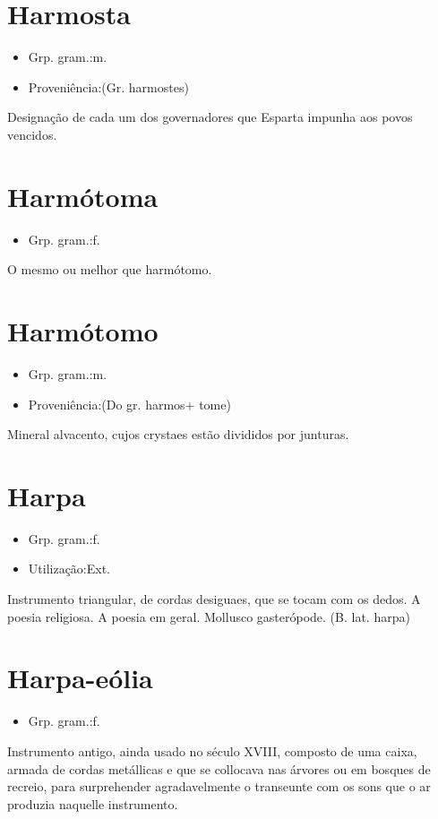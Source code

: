\documentclass{article}
\begin{document}
\section{Harmosta}
\begin{itemize}
\item {Grp. gram.:m.}
\end{itemize}
\begin{itemize}
\item {Proveniência:(Gr. \textunderscore harmostes\textunderscore )}
\end{itemize}
Designação de cada um dos governadores que Esparta impunha aos povos vencidos.
\section{Harmótoma}
\begin{itemize}
\item {Grp. gram.:f.}
\end{itemize}
O mesmo ou melhor que \textunderscore harmótomo\textunderscore .
\section{Harmótomo}
\begin{itemize}
\item {Grp. gram.:m.}
\end{itemize}
\begin{itemize}
\item {Proveniência:(Do gr. \textunderscore harmos\textunderscore  + \textunderscore tome\textunderscore )}
\end{itemize}
Mineral alvacento, cujos crystaes estão divididos por junturas.
\section{Harpa}
\begin{itemize}
\item {Grp. gram.:f.}
\end{itemize}
\begin{itemize}
\item {Utilização:Ext.}
\end{itemize}
Instrumento triangular, de cordas desiguaes, que se tocam com os dedos.
A poesia religiosa.
A poesia em geral.
Mollusco gasterópode.
(B. lat. \textunderscore harpa\textunderscore )
\section{Harpa-eólia}
\begin{itemize}
\item {Grp. gram.:f.}
\end{itemize}
Instrumento antigo, ainda usado no século XVIII, composto de uma caixa, armada de cordas metállicas e que se collocava nas árvores ou em bosques de recreio, para surprehender agradavelmente o transeunte com os sons que o ar produzia naquelle instrumento.
\end{document}

